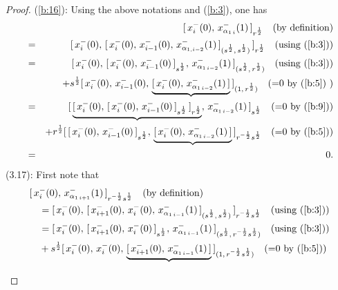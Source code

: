 \documentclass{amsproc}
\theoremstyle{remark}
\numberwithin{equation}{section}
\begin{document}
\begin{proof} (\ref{b:16}): Using the above notations and (\ref{b:3}), one has
\begin{eqnarray*}
&&[\,x_i^-{(0)},\, x_{\alpha_{1\,i}}^-(1)\,]_{r^{\frac{1}{2}}}
\quad {\hbox{(by definition)}}\\
&=&[\,x_i^-(0),\,[\,x_{i}^-(0),\,x_{i-1}^-(0),\,x_{\alpha_{1,i-2}}^-(1)
\,]_{(s^{\frac{1}{2}},\,s^{\frac{1}{2}})}\,]_{r^{\frac{1}{2}}}
\quad {\hbox{(using (\ref{b:3}))}}\\
&=&[\,x_i^-(0),\,[\,x_{i}^-(0),\,x_{i-1}^-(0)\,]_{s^{\frac{1}{2}}}
,\,x_{\alpha_{1\,i-2}}^-(1)\,]_{(s^{\frac{1}{2}},\,r^{\frac{1}{2}})}
\quad {\hbox{(using (\ref{b:3}))}}\\
&&+s^{\frac{1}{2}}[\,x_i^-(0),\,x_{i-1}^-(0),\,
\underbrace{[\,x_{i}^-(0),\,x_{\alpha_{1\,i-2}}^-(1)\,]}
\,]_{(1,\,r^{\frac{1}{2}})}\quad {\hbox{(=0 by (\ref{b:5}) )}}\\
&=&[\,\underbrace{[\,x_i^-(0),\,[\,x_{i}^-(0),\,x_{i-1}^-(0)\,]_{s^{\frac{1}{2}}}
\,]_{r^{\frac{1}{2}}}}
,\,x_{\alpha_{1\,i-2}}^-(1)\,]_{s^{\frac{1}{2}}}\quad {\hbox{(=0 by $(\ref{b:9})$)}}\\
&&+r^{\frac{1}{2}}[\,[\,x_{i}^-(0),\,x_{i-1}^-(0)\,]_{s^{\frac{1}{2}}}
,\,\underbrace{[\,x_{i}^-(0),\,x_{\alpha_{1\,i-2}}^-(1)\,]}
\,]_{r^{-\frac{1}{2}}s^{\frac{1}{2}}}\quad {\hbox{(=0 by (\ref{b:5}))}}\\
&=&0.
\end{eqnarray*}
(3.17): First note that
\begin{eqnarray*}
\begin{split}
&[\,x_i^-{(0)},\, x_{\alpha_{1\,i+1}}^-(1)\,]_{r^{-\frac{1}{2}}s^{\frac{1}{2}}}
\quad {\hbox{(by definition)}}\\
&\quad=[\,x_i^-(0),\,[\,x_{i+1}^-(0),\,x_i^-(0),\,x_{\alpha_{1\,i-1}}^-(1)
\,]_{(s^{\frac{1}{2}},\,s^{\frac{1}{2}})}\,]_{r^{-\frac{1}{2}}s^{\frac{1}{2}}}
\quad {\hbox{(using (\ref{b:3}))}}\\
&\quad=[\,x_i^-(0),\,[\,x_{i+1}^-(0),\,x_i^-(0)\,]_{s^{\frac{1}{2}}}
,\,x_{\alpha_{1\,i-1}}^-(1)\,]_{(s^{\frac{1}{2}},\,r^{-\frac{1}{2}}s^{\frac{1}{2}})}
\quad {\hbox{(using (\ref{b:3}))}}\\
&\quad+s^{\frac{1}{2}}[\,x_i^-(0),\,x_i^-(0),\,
\underbrace{[\,x_{i+1}^-(0),\,x_{\alpha_{1\,i-1}}^-(1)\,]}
\,]_{(1,\,r^{-\frac{1}{2}}s^{\frac{1}{2}})}\quad {\hbox{(=0 by (\ref{b:5}))}}\\
\end{split}
\end{eqnarray*}
\begin{eqnarray*}

\end{eqnarray*}
\end{proof}
\end{document}
